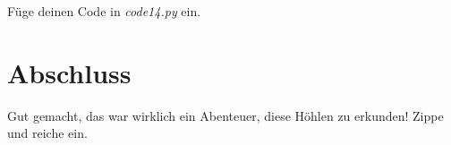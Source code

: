 \documentclass[
]{book}
\begin{document}
Füge deinen Code in \emph{code14.py} ein.

\hypertarget{abschluss-1}{%
\section{Abschluss}\label{abschluss-1}}

Gut gemacht, das war wirklich ein Abenteuer, diese Höhlen zu erkunden! Zippe und reiche ein.

  
\end{document}
